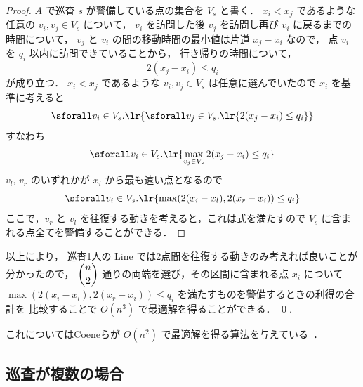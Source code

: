 \begin{proof}
	$A$ で巡査 $s$ が警備している点の集合を $V_s$ と書く．
	$x_i < x_j$ であるような任意の $v_i, v_j \in V_s$ について，
	$v_i$ を訪問した後 $v_j$ を訪問し再び $v_i$ に戻るまでの時間について，
	$v_j$ と $v_i$ の間の移動時間の最小値は片道 $x_j - x_i$ なので，
	点 $v_i$ を $q_i$ 以内に訪問できていることから，
	行き帰りの時間について，
	\begin{equation}
		2(x_j - x_i) \leq q_i
	\end{equation}
	が成り立つ．
	$x_i < x_j$ であるような $v_i, v_j \in V_s $ は任意に選んでいたので
	$x_i$ を基準に考えると
	\begin{equation}
		\sforall v_i \in V_s . \lr{
			\sforall v_j \in V_s . 
			\lr{ 2(x_j - x_i) \leq q_i }
		}
	\end{equation}
	すなわち
	\begin{equation}
		\sforall v_i \in V_s . \lr{
			\max_{v_j \in V_s} 2(x_j - x_i) \leq q_i
		}
	\end{equation}
	$v_l$, $v_r$ のいずれかが $x_i$ から最も遠い点となるので
	\begin{equation}
		\sforall v_i \in V_s . \lr{
			\max( 2(x_i - x_l), 2(x_r - x_i) ) \leq q_i
		}
		\label{eq:PatrolonLine_2}
	\end{equation}
	ここで，$v_r$ と $v_l$ を往復する動きを考えると，これは式を満たすので
	$V_s$ に含まれる点全てを警備することができる．
\end{proof}

以上により， 巡査1人の Line では2点間を往復する動きのみ考えれば良いことが分かったので，
$\dbinom{n}{2}$ 通りの両端を選び，その区間に含まれる点 $x_i$ について
$\max( 2(x_i - x_l), 2(x_r - x_i) ) \leq q_i$ を満たすものを警備するときの利得の合計を
比較することで $O(n^3)$ で最適解を得ることができる．
\qed {}.

これについてはCoeneらが
$O(n^2)$ で最適解を得る算法を与えている~\cite{coene2011charlemagne}．




\subsection{巡査が複数の場合}

